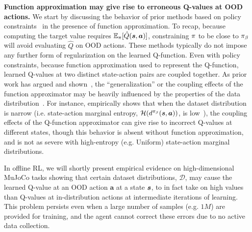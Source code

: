 \textbf{Function approximation may give rise to erroneous Q-values at OOD actions.} We start by discussing the behavior of prior methods based on policy constraints~\citep{kumar2019stabilizing,fujimoto2018off,jaques2019way,wu2019behavior} in the presence of function approximation.
To recap, because computing the target value requires $\mathbb{E}_\pi[\hat{Q}(\boldsymbol{s},\boldsymbol{a})]$, constraining $\pi$ to be close to ${\pi_\beta}$ will avoid evaluating $\hat{Q}$ on OOD actions. These methods typically do not impose any further form of regularization on the learned Q-function.
Even with policy constraints, because function approximation used to represent the Q-function, learned Q-values at two distinct state-action pairs are coupled together. As prior work has argued and shown~\citep{achiam2019towards,fu2019diagnosing,kumar2020discor}, the ``generalization'' or the coupling effects of the function approximator may be heavily influenced by the properties of the data distribution~\citep{fu2019diagnosing,kumar2020discor}. For instance, \citet{fu2019diagnosing} empirically shows that when the dataset distribution is narrow (i.e. state-action marginal entropy, $\mathcal{H}(d^{\pi_\beta}(\boldsymbol{s}, \boldsymbol{a}))$, is low~\citep{fu2019diagnosing}), the coupling effects of the Q-function approximator can give rise to incorrect Q-values at different states, though this behavior is absent without function approximation, and is not as severe with high-entropy (e.g. Uniform) state-action marginal distributions.

In offline RL, we will shortly present empirical evidence on high-dimensional MuJoCo tasks showing that certain dataset distributions, $\mathcal{D}$, may cause the learned Q-value at an OOD action $\mathbf{a}$ at a state $\boldsymbol{s}$, to in fact take on high values than Q-values at in-distribution actions at intermediate iterations of learning. This problem persists even when a large number of samples (e.g. $1M$) are provided for training, and the agent cannot correct these errors due to no active data collection.  

